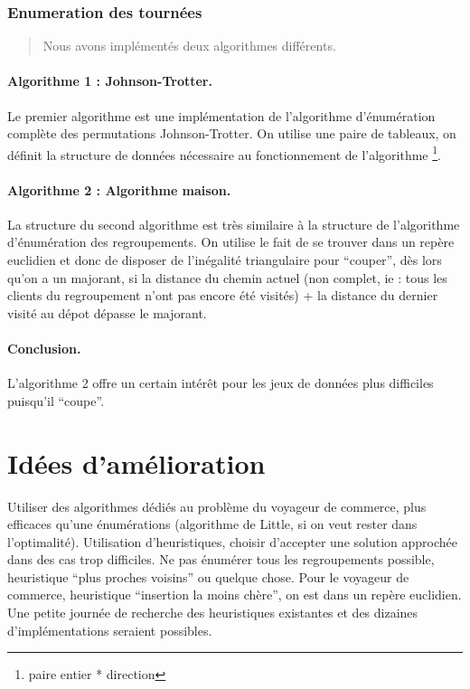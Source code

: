 \documentclass[a4paper,10pt]{article}
\begin{document}
\subsubsection{Enumeration des tournées}

\begin{quote}
  Nous avons implémentés deux algorithmes différents.
\end{quote}
\paragraph{Algorithme 1 : Johnson-Trotter.}

Le premier algorithme est une implémentation de l'algorithme d'énumération complète des permutations Johnson-Trotter.
On utilise une paire de tableaux, on définit la structure de données nécessaire au fonctionnement de l'algorithme
\footnote{paire entier * direction}.

\paragraph{Algorithme 2 : Algorithme maison.}

La structure du second algorithme est très similaire à la structure de l'algorithme d'énumération des regroupements. 
On utilise le fait de se trouver dans un repère euclidien et donc de disposer de l'inégalité triangulaire pour ``couper'',
dès lors qu'on a un majorant, si la distance du chemin actuel (non complet, ie : tous les clients du regroupement
n'ont pas encore été visités) + la distance du dernier visité au dépot dépasse le majorant.

\paragraph{Conclusion.}

L'algorithme 2 offre un certain intérêt pour les jeux de données plus difficiles puisqu'il ``coupe''.

\section{Idées d'amélioration}
Utiliser des algorithmes dédiés au problème du voyageur de commerce, plus efficaces qu'une énumérations
(algorithme de Little, si on veut rester dans l'optimalité).
Utilisation d'heuristiques, choisir d'accepter une solution approchée dans des cas trop difficiles.
Ne pas énumérer tous les regroupements possible, heuristique ``plus proches voisins'' ou quelque chose.
Pour le voyageur de commerce, heuristique ``insertion la moins chère'', on est dans un repère euclidien.
Une petite journée de recherche des heuristiques existantes et des dizaines d'implémentations seraient possibles.
\end{document}
